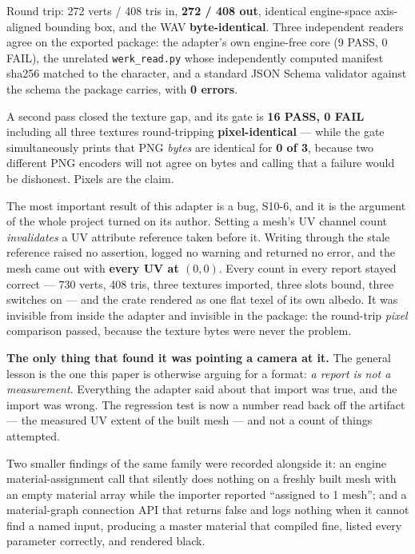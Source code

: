 \documentclass[10pt,twocolumn,letterpaper]{article}
\newcommand{\code}[1]{\texttt{\small #1}}
\begin{document}
Round trip: 272 verts / 408 tris in, \textbf{272 / 408 out}, identical engine-space
axis-aligned bounding box, and the WAV \textbf{byte-identical}. Three independent
readers agree on the exported package: the adapter's own engine-free core (9 PASS,
0 FAIL), the unrelated \code{werk\_read.py} whose independently computed manifest
sha256 matched to the character, and a standard JSON Schema validator against the
schema the package carries, with \textbf{0 errors}.

A second pass closed the texture gap, and its gate is \textbf{16 PASS, 0 FAIL}
including all three textures round-tripping \textbf{pixel-identical} --- while the
gate simultaneously prints that PNG \emph{bytes} are identical for \textbf{0 of 3},
because two different PNG encoders will not agree on bytes and calling that a
failure would be dishonest. Pixels are the claim.

The most important result of this adapter is a bug, S10-6, and it is the argument
of the whole project turned on its author. Setting a mesh's UV channel count
\emph{invalidates} a UV attribute reference taken before it. Writing through the
stale reference raised no assertion, logged no warning and returned no error, and
the mesh came out with \textbf{every UV at $(0,0)$}. Every count in every report
stayed correct --- 730 verts, 408 tris, three textures imported, three slots bound,
three switches on --- and the crate rendered as one flat texel of its own albedo.
It was invisible from inside the adapter and invisible in the package: the
round-trip \emph{pixel} comparison passed, because the texture bytes were never the
problem.

\textbf{The only thing that found it was pointing a camera at it.} The general
lesson is the one this paper is otherwise arguing for a format:
\emph{a report is not a measurement}. Everything the adapter said about that
import was true, and the import was wrong. The regression test is now a number
read back off the artifact --- the measured UV extent of the built mesh --- and
not a count of things attempted.

Two smaller findings of the same family were recorded alongside it: an engine
material-assignment call that silently does nothing on a freshly built mesh with
an empty material array while the importer reported ``assigned to 1 mesh''; and a
material-graph connection API that returns false and logs nothing when it cannot
find a named input, producing a master material that compiled fine, listed every
parameter correctly, and rendered black.
\end{document}
